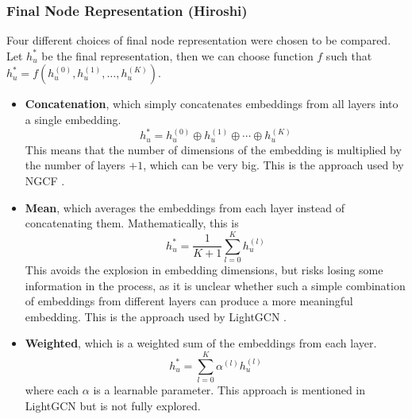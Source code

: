 \documentclass{article}
\begin{document}
\subsubsection{Final Node Representation (Hiroshi)} \label{final_node_representation}

Four different choices of final node representation were chosen to be compared. Let $h_u^*$ be the final representation, then we can choose function $f$ such that $h_u^*=f(h_u^{(0)},h_u^{(1)},\hdots,h_u^{(K)})$.

\begin{itemize}
    \item \textbf{Concatenation}, which simply concatenates embeddings from all layers into a single embedding.
    $$h_u^*=h_u^{(0)} \oplus h_u^{(1)} \oplus \cdots \oplus h_u^{(K)}$$
    This means that the number of dimensions of the embedding is multiplied by the number of layers $+1$, which can be very big. This is the approach used by NGCF \cite{ngcf}.
    \item \textbf{Mean}, which averages the embeddings from each layer instead of concatenating them. Mathematically, this is
    $$h_u^*=\frac{1}{K+1}\sum_{l=0}^Kh_u^{(l)}$$
    This avoids the explosion in embedding dimensions, but risks losing some information in the process, as it is unclear whether such a simple combination of embeddings from different layers can produce a more meaningful embedding. This is the approach used by LightGCN \cite{lightgcn}.
    \item \textbf{Weighted}, which is a weighted sum of the embeddings from each layer.
    $$h_u^*=\sum_{l=0}^K\alpha^{(l)}h_u^{(l)}$$
    where each $\alpha$ is a learnable parameter. This approach is mentioned in LightGCN \cite{lightgcn} but is not fully explored.
    

\end{itemize}
\end{document}
